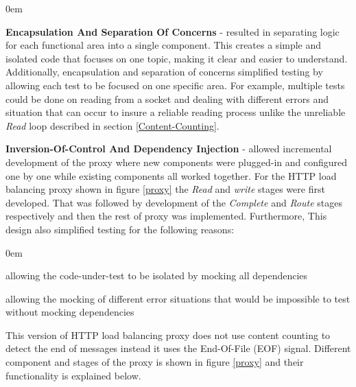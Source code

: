 \documentclass[a4paper,11pt,twoside]{article}
\begin{document}
\begin{list}{-}{}
  \itemsep0em
  \item\textbf{Encapsulation And Separation Of Concerns} - resulted in separating logic for each functional area into a single component. This creates a simple and isolated code that focuses on one topic, making it clear and easier to understand. Additionally, encapsulation and separation of concerns simplified testing by allowing each test to be focused on one specific area. For example, multiple tests could be done on reading from a socket and dealing with different errors and situation that can occur to insure a reliable reading process unlike the unreliable  \textit{Read} loop described in section \ref{Content-Counting}. 

  \item\textbf{Inversion-Of-Control And Dependency Injection} - allowed incremental development of the proxy where new components were plugged-in and configured one by one while existing components all worked together. For the HTTP load balancing proxy shown in figure \ref{proxy} the  \textit{Read} and  \textit{write} stages were first developed. That was followed by development of the  \textit{Complete} and  \textit{Route} stages respectively and then the rest of proxy was implemented. Furthermore, This design also simplified testing for the following reasons:
\begin{list}{-}{}
  \itemsep0em
  \item allowing the code-under-test to be isolated by mocking all dependencies 
  
  \item allowing the mocking of different error situations that would be impossible to test without mocking dependencies
  
\end{list}

\end{list}

\noindent
This version of HTTP load balancing proxy does not use content counting to detect the end of messages instead it uses the End-Of-File (EOF) signal. Different component and stages of the proxy is shown in figure \ref{proxy} and their functionality is explained below.\\
\end{document}
